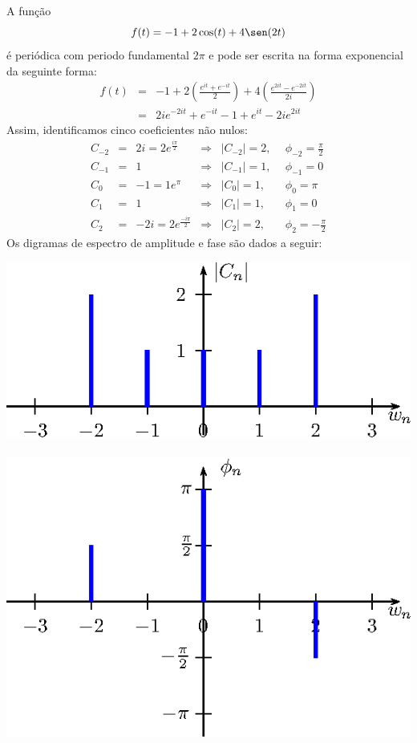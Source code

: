 \begin{ex} A função 
\begin{equation}f(t)=-1+2\cos(t)+4\sen(2t)\end{equation}
é periódica com periodo fundamental $2\pi$ e pode ser escrita na forma exponencial da seguinte forma:
\begin{eqnarray*}
f(t)&=&-1+2\left(\frac{e^{it}+e^{-it}}{2}\right)+4\left(\frac{e^{2it}-e^{-2it}}{2i}\right)\\
&=&2i e^{-2it} + e^{-it}-1+e^{it}- 2ie^{2it}
\end{eqnarray*}
Assim, identificamos cinco coeficientes não nulos:
\begin{equation*}
\begin{array}{lclcll}
 C_{-2}&=&2i=2e^{\frac{i\pi}{2}} &\Longrightarrow& |C_{-2}|=2, ~~ &\phi_{-2}=\frac{\pi}{2}\\
 C_{-1}&=&1 &\Longrightarrow& |C_{-1}|=1, ~~ &\phi_{-1}=0\\
 C_{0}&=&-1=1e^{\pi} &\Longrightarrow& |C_{0}|=1, ~~ &\phi_0=\pi\\
 C_{1}&=&1 &\Longrightarrow& |C_{1}|=1, ~~ &\phi_1=0\\
 C_{2}&=&-2i=2e^{\frac{-i\pi}{2}} &\Longrightarrow& |C_{2}|=2, ~~ &\phi_2=-\frac{\pi}{2}
\end{array}
 \end{equation*}
Os digramas de espectro de amplitude e fase são dados a seguir:

\includegraphics{cap_diagramas_espectro/pics/figura_2}~\includegraphics{cap_diagramas_espectro/pics/figura_3}

\end{ex}
